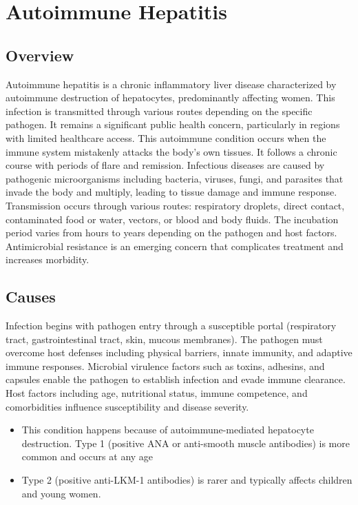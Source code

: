 \chapter{Autoimmune Hepatitis}
\label{sec:Autoimmune Hepatitis}

\section{Overview}
Autoimmune hepatitis is a chronic inflammatory liver disease characterized by autoimmune destruction of hepatocytes, predominantly affecting women. This infection is transmitted through various routes depending on the specific pathogen. It remains a significant public health concern, particularly in regions with limited healthcare access. This autoimmune condition occurs when the immune system mistakenly attacks the body's own tissues. It follows a chronic course with periods of flare and remission. Infectious diseases are caused by pathogenic microorganisms including bacteria, viruses, fungi, and parasites that invade the body and multiply, leading to tissue damage and immune response. Transmission occurs through various routes: respiratory droplets, direct contact, contaminated food or water, vectors, or blood and body fluids. The incubation period varies from hours to years depending on the pathogen and host factors. Antimicrobial resistance is an emerging concern that complicates treatment and increases morbidity.
\section{Causes}
Infection begins with pathogen entry through a susceptible portal (respiratory tract, gastrointestinal tract, skin, mucous membranes). The pathogen must overcome host defenses including physical barriers, innate immunity, and adaptive immune responses. Microbial virulence factors such as toxins, adhesins, and capsules enable the pathogen to establish infection and evade immune clearance. Host factors including age, nutritional status, immune competence, and comorbidities influence susceptibility and disease severity.

\begin{itemize}[noitemsep]
  \item This condition happens because of autoimmune-mediated hepatocyte destruction. Type 1 (positive ANA or anti-smooth muscle antibodies) is more common and occurs at any age
  \item Type 2 (positive anti-LKM-1 antibodies) is rarer and typically affects children and young women.
\end{itemize}
